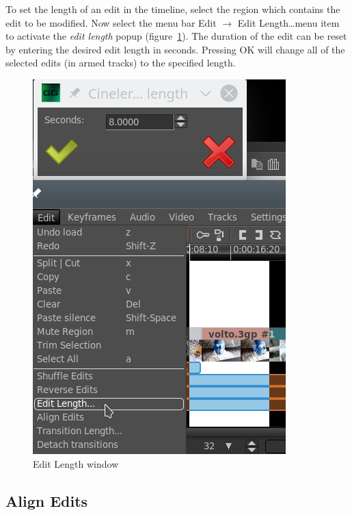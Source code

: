 To set the length of an edit in the timeline, select the region which contains the edit to be modified. Now select the menu bar Edit $\rightarrow$ Edit Length\dots menu item to activate the \textit{edit length} popup (figure~\ref{fig:lenght}).  The duration of the edit can be reset by entering the desired edit length in seconds.  Pressing OK will change all of the selected edits (in armed tracks) to the specified length.
\begin{figure}[htpb]
    \centering
    \includegraphics[width=0.6\linewidth]{images/lenght.png}
    \caption{Edit Length window}
    \label{fig:lenght}
\end{figure}

\subsection{Align Edits}%
\label{sub:align_edits}

